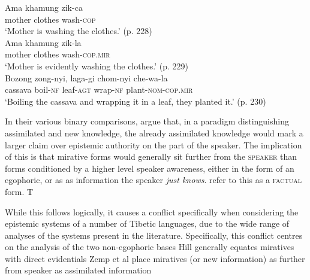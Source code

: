 \begin{exe}
        \ex
        \begin{xlist}
                \ex\label{e:Description:TshanglaPresNonMir}
                \gll Ama khamung zik-ca \\
                mother clothes wash-\textsc{cop} \\
                \glt `Mother is washing the clothes.' (p. 228) \\
                \ex\label{e:Description:TshanglaPresMir}
                \gll Ama khamung zik-la \\
                mother clothes wash-\textsc{cop.mir} \\
                \glt `Mother is evidently washing the clothes.' (p. 229) \\
                \ex\label{e:Description:TshanglaNarrativeNonMir}
                \gll Bozong zong-nyi, laga-gi chom-nyi che-wa-la \\
                cassava boil-\textsc{nf} leaf-\textsc{agt} wrap-\textsc{nf} plant-\textsc{nom}-\textsc{cop.mir} \\
                \glt `Boiling the cassava and wrapping it in a leaf, they planted it.' (p. 230)
        \end{xlist}
        \cite[Tshangla,][]{Andvik2010}
\end{exe}

In their various binary comparisons,  argue that, in a paradigm distinguishing assimilated and new knowledge, the already assimilated knowledge would mark a larger claim over epistemic authority on the part of the speaker. The implication of this is that mirative forms would generally sit further from the \textsc{speaker} than forms conditioned by a higher level speaker awareness, either in the form of an egophoric, or as as information the speaker \textit{just knows}.  refer to this as a \textsc{factual} form.
T

While this follows logically, it causes a conflict specifically when considering the epistemic systems of a number of Tibetic languages, due to the wide range of analyses of the systems present in the literature. Specifically, this conflict centres on the analysis of the two non-egophoric bases
Hill generally equates miratives with direct evidentials
Zemp et al place miratives (or new information) as further from speaker as assimilated information


